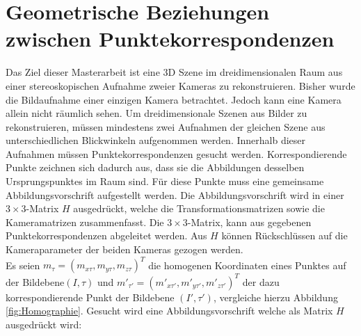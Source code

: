 \chapter{Geometrische Beziehungen zwischen Punktekorrespondenzen}
\label{sec:HFE}

Das Ziel dieser Masterarbeit ist eine 3D Szene im dreidimensionalen Raum aus einer stereoskopischen Aufnahme zweier Kameras zu rekonstruieren. Bisher wurde die Bildaufnahme einer einzigen Kamera betrachtet. Jedoch kann eine Kamera allein nicht räumlich sehen. Um dreidimensionale Szenen aus Bilder zu rekonstruieren, müssen mindestens zwei Aufnahmen der gleichen Szene aus unterschiedlichen Blickwinkeln aufgenommen werden. Innerhalb dieser Aufnahmen müssen Punktekorrespondenzen gesucht werden. Korrespondierende Punkte zeichnen sich dadurch aus, dass sie die Abbildungen desselben Ursprungspunktes im Raum sind. Für diese Punkte muss eine gemeinsame Abbildungsvorschrift aufgestellt werden. Die Abbildungsvorschrift wird in einer $3 \times 3$-Matrix $H$ ausgedrückt, welche die Transformationsmatrizen sowie die Kameramatrizen zusammenfasst. Die $3 \times 3$-Matrix, kann aus gegebenen Punktekorrespondenzen abgeleitet werden. Aus $H$ können Rückschlüssen auf die Kameraparameter der beiden Kameras gezogen werden.  \\


%

Es seien \ensuremath{m_{\tau} =(m_{x\tau},m_{y\tau},m_{z\tau})^T} die homogenen Koordinaten eines Punktes auf der Bildebene$(I,\tau)$ und \ensuremath{m'_{\tau'} = (m'_{x\tau'},m'_{y\tau'},m'_{z\tau'})^T} der dazu korrespondierende Punkt der Bildebene $(I',\tau')$, vergleiche hierzu Abbildung \ref{fig:Homographie}. Gesucht wird eine Abbildungsvorschrift welche als Matrix $H$ ausgedrückt wird:

